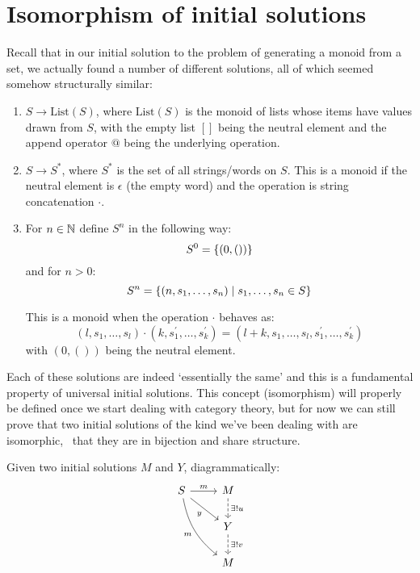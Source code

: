 \section{Isomorphism of initial solutions}

Recall that in our initial solution to the problem of generating a monoid
from a set, we actually found a number of different solutions, all of which
seemed somehow structurally similar:

\begin{enumerate}

\item $S \to \mathrm{List}(S)$, where $\mathrm{List}(S)$ is the monoid of lists
whose items have values drawn from $S$, with the empty list $[]$ being the
neutral element and the append operator $@$ being the underlying operation.

\item $S \to S^\ast$, where $S^\ast$ is the set of all strings/words on $S$.
This is a monoid if the neutral element is $\epsilon$ (the empty word) and the
operation is string concatenation $\cdot$.

\item For $n \in \mathbb{N}$ define $S^n$ in the following way:
$$S^0 = \{ (0, ()) \}$$
and for $n > 0$:
$$S^n = \{ (n, s_1, \ldots, s_n) \mid s_1, \ldots, s_n \in S \}$$

This is a monoid when the operation $\cdot$ behaves as:
$$(l, s_1, \ldots, s_l) \cdot (k, s_1^\prime, \ldots, s_k^\prime) =
(l + k, s_1, \ldots, s_l, s_1^\prime, \ldots, s_k^\prime)$$
with $(0, ())$ being the neutral element.

\end{enumerate}

Each of these solutions are indeed `essentially the same' and this is a
fundamental property of universal initial solutions. This concept (isomorphism)
will properly be defined once we start dealing with category theory, but for now
we can still prove that two initial solutions of the kind we've been dealing
with are isomorphic, \ie~that they are in bijection and share structure.

Given two initial solutions $M$ and $Y$, diagrammatically:
$$
\begin{tikzcd}
    S \arrow[r, "m"] \arrow[rd, swap, "y"]
    \arrow[rdd, swap, bend right = 20, "m"] & 
    M \arrow[d, dashed, "\exists! u"] \\
    {} & Y \arrow[d, dashed, "\exists! v"] \\
    {} & M
\end{tikzcd}
$$

